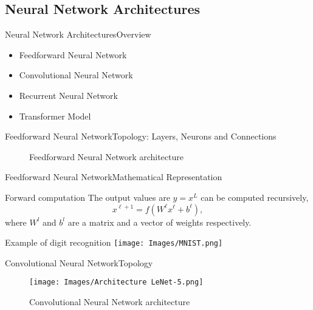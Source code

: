 \documentclass{beamer}
\begin{document}
\subsection{Neural Network Architectures}

\begin{frame}{Neural Network Architectures}{Overview}
  \begin{itemize}
    \item Feedforward Neural Network
    \item Convolutional Neural Network
    \item Recurrent Neural Network
    \item Transformer Model
  \end{itemize}
\end{frame}

\begin{frame}{Feedforward Neural Network}{Topology: Layers, Neurons and Connections}
  \begin{figure}
    
    \caption{Feedforward Neural Network architecture}
  \end{figure}
\end{frame}

\begin{frame}{Feedforward Neural Network}{Mathematical Representation}
  \begin{block}{Forward computation}
    The output values are \(y = x^L\) can be computed recursively,
    \begin{equation}
      x^{\ell+1} = f\left(W^\ell x^\ell + b^\ell\right),
    \end{equation}
    where \(W^l\) and \(b^l\) are a matrix and a vector of weights
    respectively.
  \end{block}
  \begin{exampleblock}{Example of digit recognition}
    \centering
    \texttt{[image: Images/MNIST.png]}
  \end{exampleblock}
\end{frame}

\begin{frame}{Convolutional Neural Network}{Topology}
  \begin{figure}
    \texttt{[image: Images/Architecture LeNet-5.png]}
    \caption{Convolutional Neural Network architecture}
  \end{figure}
\end{frame}
\end{document}
